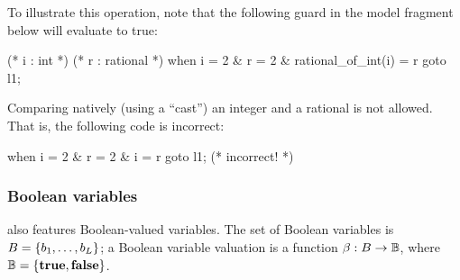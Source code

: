 \begin{example}
	To illustrate this operation, note that the following guard in the model fragment below will evaluate to true:

	\begin{IMITATORmodel}
		(* i : int *)
		(* r : rational *)
		when i = 2 & r = 2 & rational_of_int(i) = r goto l1;
	\end{IMITATORmodel}
\end{example}

\begin{remark}
	Comparing natively (using a ``cast'') an integer and a rational is not allowed.
	That is, the following code is incorrect:

		\begin{IMITATORmodel}
			when i = 2 & r = 2 & i = r goto l1; (* incorrect! *)
		\end{IMITATORmodel}
\end{remark}


\subsubsection{Boolean variables}

\imitator{} also features Boolean-valued variables.
The set of Boolean variables is $B = \{ b_1, \dots, b_L \} $;
a Boolean variable valuation is a function $\beta : B \rightarrow \mathbb B$, where $\mathbb B = \{\mathbf{true}, \mathbf{false} \}$.

